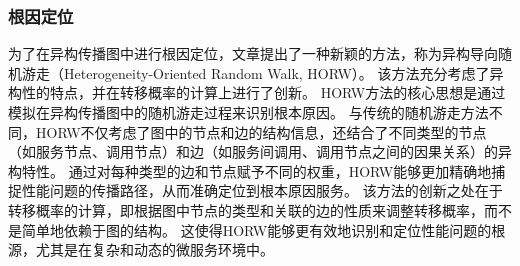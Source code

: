 \subsubsection{根因定位}

为了在异构传播图中进行根因定位，文章提出了一种新颖的方法，称为异构导向随机游走（Heterogeneity-Oriented Random Walk, HORW）。
该方法充分考虑了异构性的特点，并在转移概率的计算上进行了创新。
HORW方法的核心思想是通过模拟在异构传播图中的随机游走过程来识别根本原因。
与传统的随机游走方法不同，HORW不仅考虑了图中的节点和边的结构信息，还结合了不同类型的节点（如服务节点、调用节点）和边（如服务间调用、调用节点之间的因果关系）的异构特性。
通过对每种类型的边和节点赋予不同的权重，HORW能够更加精确地捕捉性能问题的传播路径，从而准确定位到根本原因服务。
该方法的创新之处在于转移概率的计算，即根据图中节点的类型和关联的边的性质来调整转移概率，而不是简单地依赖于图的结构。
这使得HORW能够更有效地识别和定位性能问题的根源，尤其是在复杂和动态的微服务环境中。
